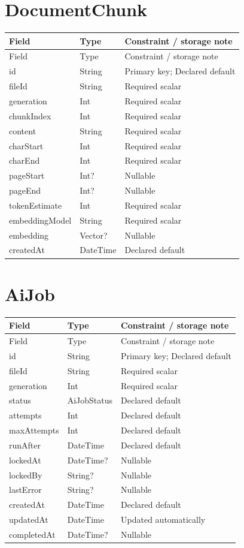 \section{DocumentChunk}
\begin{longtable}{p{.31\linewidth}p{.23\linewidth}p{.36\linewidth}}\toprule Field&Type&Constraint / storage note\\\midrule\endfirsthead\toprule Field&Type&Constraint / storage note\\\midrule\endhead
id&String&Primary key; Declared default\\
fileId&String&Required scalar\\
generation&Int&Required scalar\\
chunkIndex&Int&Required scalar\\
content&String&Required scalar\\
charStart&Int&Required scalar\\
charEnd&Int&Required scalar\\
pageStart&Int?&Nullable\\
pageEnd&Int?&Nullable\\
tokenEstimate&Int&Required scalar\\
embeddingModel&String&Required scalar\\
embedding&Vector?&Nullable\\
createdAt&DateTime&Declared default\\
\bottomrule\end{longtable}

\section{AiJob}
\begin{longtable}{p{.31\linewidth}p{.23\linewidth}p{.36\linewidth}}\toprule Field&Type&Constraint / storage note\\\midrule\endfirsthead\toprule Field&Type&Constraint / storage note\\\midrule\endhead
id&String&Primary key; Declared default\\
fileId&String&Required scalar\\
generation&Int&Required scalar\\
status&AiJobStatus&Declared default\\
attempts&Int&Declared default\\
maxAttempts&Int&Declared default\\
runAfter&DateTime&Declared default\\
lockedAt&DateTime?&Nullable\\
lockedBy&String?&Nullable\\
lastError&String?&Nullable\\
createdAt&DateTime&Declared default\\
updatedAt&DateTime&Updated automatically\\
completedAt&DateTime?&Nullable\\
\bottomrule\end{longtable}
